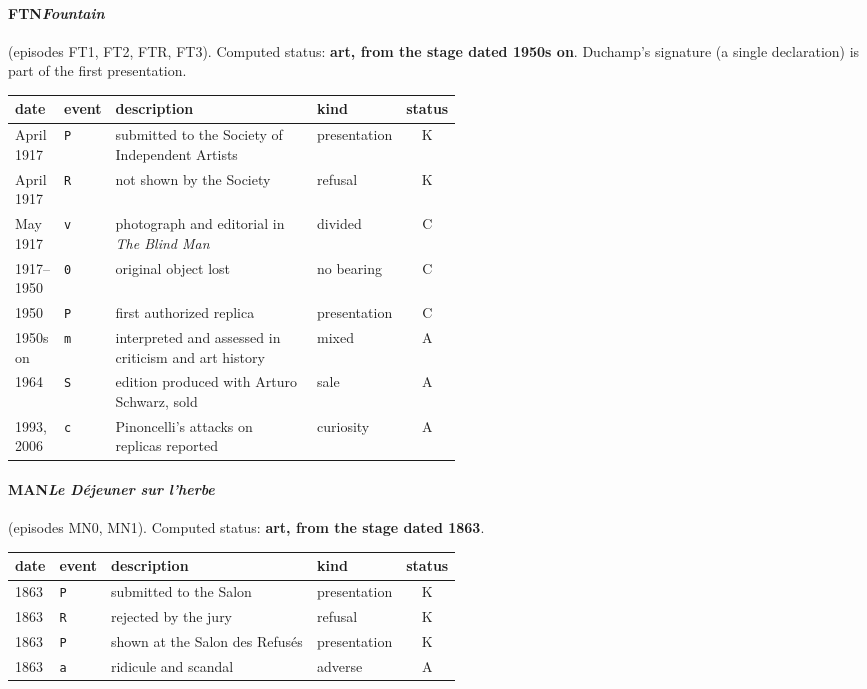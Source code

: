 \paragraph{FTN\enspace \emph{Fountain}} (episodes FT1, FT2, FTR, FT3). Computed status: \textbf{art, from the stage dated 1950s on}. Duchamp's signature (a single declaration) is part of the first presentation.
\begin{center}\footnotesize\begin{tabular}{@{}llp{0.52\linewidth}lc@{}}
date & event & description & kind & status \\ \midrule
April 1917 & \texttt{P} & submitted to the Society of Independent Artists & presentation & K \\
April 1917 & \texttt{R} & not shown by the Society & refusal & K \\
May 1917 & \texttt{v} & photograph and editorial in \emph{The Blind Man} & divided & C \\
1917--1950 & \texttt{0} & original object lost & no bearing & C \\
1950 & \texttt{P} & first authorized replica & presentation & C \\
1950s on & \texttt{m} & interpreted and assessed in criticism and art history & mixed & A \\
1964 & \texttt{S} & edition produced with Arturo Schwarz, sold & sale & A \\
1993, 2006 & \texttt{c} & Pinoncelli's attacks on replicas reported & curiosity & A \\
\end{tabular}\end{center}

\paragraph{MAN\enspace \emph{Le D\'ejeuner sur l'herbe}} (episodes MN0, MN1). Computed status: \textbf{art, from the stage dated 1863}.
\begin{center}\footnotesize\begin{tabular}{@{}llp{0.52\linewidth}lc@{}}
date & event & description & kind & status \\ \midrule
1863 & \texttt{P} & submitted to the Salon & presentation & K \\
1863 & \texttt{R} & rejected by the jury & refusal & K \\
1863 & \texttt{P} & shown at the Salon des Refus\'es & presentation & K \\
1863 & \texttt{a} & ridicule and scandal & adverse & A \\
\end{tabular}\end{center}

